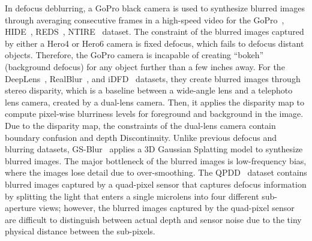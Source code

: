 In defocus deblurring, a GoPro black camera is used to synthesize blurred images through averaging consecutive frames in a high-speed video for the GoPro~\cite{nah2017deep}, HIDE~\cite{shen2019human}, REDS~\cite{nah2019ntire}, NTIRE~\cite{nah2021ntire} dataset. The constraint of the blurred images captured by either a Hero4 or Hero6 camera is fixed defocus, which fails to defocus distant objects. Therefore, the GoPro camera is incapable of creating “bokeh” (background defocus) for any object further than a few inches away. For the DeepLens~\cite{lijun2018deeplens}, RealBlur~\cite{rim2020real}, and iDFD~\cite{nazir2023idfd} datasets, they create blurred images through stereo disparity, which is a baseline between a wide-angle lens and a telephoto lens camera, created by a dual-lens camera. Then, it applies the disparity map to compute pixel-wise blurriness levels for foreground and background in the image. Due to the disparity map, the constraints of the dual-lens camera contain boundary confusion and depth Discontinuity. Unlike previous defocus and blurring datasets, GS-Blur~\cite{lee2024gs} applies a 3D Gaussian Splatting model to synthesize blurred images. The major bottleneck of the blurred images is low-frequency bias, where the images lose detail due to over-smoothing. The QPDD~\cite{chen2025quad} dataset contains blurred images captured by a quad-pixel sensor that captures defocus information by splitting the light that enters a single microlens into four different sub-aperture views; however, the blurred images captured by the quad-pixel sensor are difficult to distinguish between actual depth and sensor noise due to the tiny physical distance between the sub-pixels.



